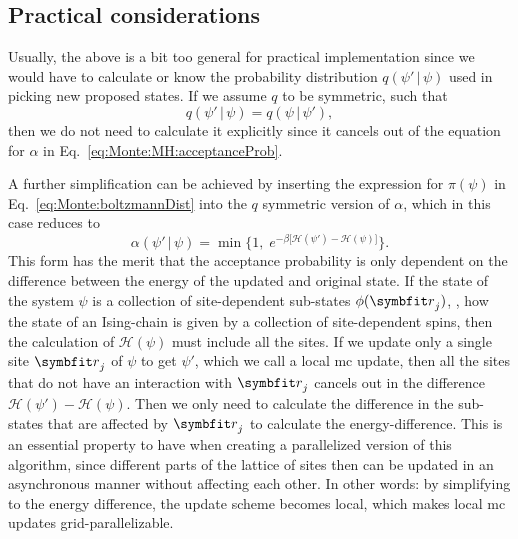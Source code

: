 \subsection{Practical considerations}

Usually, the above is a bit too general for practical implementation since we would have to calculate or know the probability
distribution $q(\psi'\,|\,\psi)$ used in picking new proposed states. If we assume $q$ to be symmetric, such that
\begin{equation}
    \label{eq:Monte:MH:pickDistributionSymmetry}
    q(\psi'\,|\,\psi) = q(\psi\,|\,\psi'),
\end{equation}
then we do not need to calculate it explicitly since it cancels out of the equation for $\alpha$ in Eq.~\eqref{eq:Monte:MH:acceptanceProb}.

A further simplification can be achieved by inserting the expression for $\pi(\psi)$ in Eq.~\eqref{eq:Monte:boltzmannDist} into the $q$
symmetric version of $\alpha$, which in this case reduces to
\begin{equation}
    \label{eq:Monte:MH:reducedTransitionProb}
    \alpha(\psi'\,|\,\psi) = \min\Big\{1,\;e^{-\beta\big[\mathcal{H}(\psi') - \mathcal{H}(\psi)\big]}\Big\}.
\end{equation}
This form has the merit that the acceptance probability is only dependent on the difference between the energy of the
updated and original state. If the state of the system $\psi$ is a collection of site-dependent sub-states $\phi(\v{r}_j)$,
\eg, how the state of an Ising-chain is given by a collection of site-dependent spins, then the calculation of $\mathcal{H}(\psi)$
must include all the sites. If we update only a single site $\v{r}_j$ of $\psi$ to get $\psi'$, which we call a local
\ac{mc} update, then all the sites that do not have an interaction with $\v{r}_j$ cancels out in the
difference $\mathcal{H}(\psi')-\mathcal{H}(\psi)$. Then we only need to calculate the difference in the sub-states that are
affected by $\v{r}_j$ to calculate the energy-difference. This is an essential property to have when creating a parallelized version
of this algorithm, since different parts of the lattice of sites then can be updated in an asynchronous manner without affecting
each other. In other words: by simplifying to the energy difference, the update scheme becomes local, which makes local \ac{mc}
updates grid-parallelizable.

